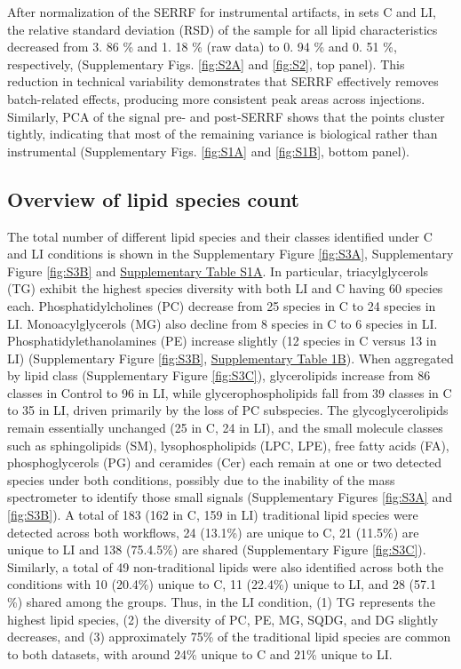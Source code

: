 \documentclass[10pt,letterpaper]{article}
\begin{document}
After normalization of the SERRF for instrumental artifacts, in sets C and LI, the relative standard deviation (RSD) of the sample  for all lipid characteristics decreased from 3. 86 \% and 1. 18 \% (raw data)  to 0. 94 \% and 0. 51 \%, respectively,  (Supplementary Figs. \ref{fig:S2A} and \ref{fig:S2}, top panel). This reduction in technical variability demonstrates that SERRF effectively removes batch-related effects, producing more consistent peak areas across injections. Similarly, PCA of the signal pre- and post-SERRF shows that the points cluster tightly, indicating that most of the remaining variance is biological rather than instrumental (Supplementary Figs. \ref{fig:S1A} and \ref{fig:S1B}, bottom panel).

\subsection*{Overview of lipid species count}
The total number of different lipid species and their classes identified under C and LI conditions is shown in the Supplementary Figure \ref{fig:S3A}, Supplementary Figure \ref{fig:S3B} and  \href{https://docs.google.com/spreadsheets/d/1SB90-QLYheKEzmHCUIh1UfgkrtbL064s8Oo5BfwFaV0/edit?gid=1876149577#gid=1876149577}{Supplementary Table S1A}. In particular, triacylglycerols (TG) exhibit the highest species diversity with both LI and C having 60 species each. Phosphatidylcholines (PC) decrease from 25 species in C to 24 species in LI. Monoacylglycerols (MG) also decline from 8 species in C to 6 species in LI. Phosphatidylethanolamines (PE) increase slightly (12 species in C versus 13 in LI) (Supplementary Figure \ref{fig:S3B}, \href{https://docs.google.com/spreadsheets/d/1SB90-QLYheKEzmHCUIh1UfgkrtbL064s8Oo5BfwFaV0/edit?gid=1876149577#gid=1876149577}{Supplementary Table 1B}). When aggregated by lipid class (Supplementary Figure \ref{fig:S3C}), glycerolipids increase from 86 classes in Control to 96 in LI, while glycerophospholipids fall from 39 classes in C to 35 in LI, driven primarily by the loss of PC subspecies. The glycoglycerolipids remain essentially unchanged (25 in C, 24 in LI), and the small molecule classes such as sphingolipids (SM), lysophospholipids (LPC, LPE), free fatty acids (FA), phosphoglycerols (PG) and ceramides (Cer) each remain at one or two detected species under both conditions, possibly due to the inability of the mass spectrometer to identify those small signals (Supplementary Figures \ref{fig:S3A} and \ref{fig:S3B}). A total of 183 (162 in C, 159 in LI) traditional lipid species were detected across both workflows, 24 (13.1\%) are unique to C, 21 (11.5\%) are unique to LI and 138 (75.4.5\%) are shared (Supplementary Figure \ref{fig:S3C}). Similarly, a total of 49 non-traditional lipids were also identified across both the conditions with 10 (20.4\%) unique to C, 11 (22.4\%) unique to LI, and 28 (57.1 \%) shared among the groups. Thus, in the LI condition, (1) TG represents the highest lipid species, (2) the diversity of PC, PE, MG, SQDG, and DG slightly decreases, and (3) approximately 75\% of the traditional lipid species are common to both datasets, with around 24\% unique to C and 21\% unique to LI.
\end{document}
